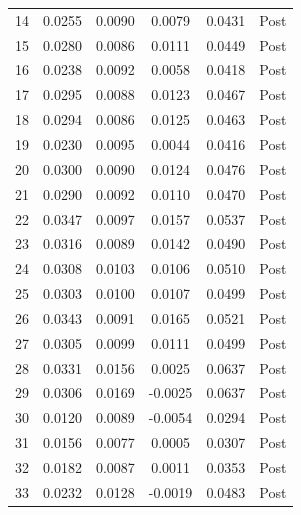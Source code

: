 \documentclass[bibtex]{article}
\begin{document}
{\begin{longtable}{cccccc}
14 & 0.0255 & 0.0090 & 0.0079 & 0.0431 & Post \\
15 & 0.0280 & 0.0086 & 0.0111 & 0.0449 & Post \\
16 & 0.0238 & 0.0092 & 0.0058 & 0.0418 & Post \\
17 & 0.0295 & 0.0088 & 0.0123 & 0.0467 & Post \\
18 & 0.0294 & 0.0086 & 0.0125 & 0.0463 & Post \\
19 & 0.0230 & 0.0095 & 0.0044 & 0.0416 & Post \\
20 & 0.0300 & 0.0090 & 0.0124 & 0.0476 & Post \\
21 & 0.0290 & 0.0092 & 0.0110 & 0.0470 & Post \\
22 & 0.0347 & 0.0097 & 0.0157 & 0.0537 & Post \\
23 & 0.0316 & 0.0089 & 0.0142 & 0.0490 & Post \\
24 & 0.0308 & 0.0103 & 0.0106 & 0.0510 & Post \\
25 & 0.0303 & 0.0100 & 0.0107 & 0.0499 & Post \\
26 & 0.0343 & 0.0091 & 0.0165 & 0.0521 & Post \\
27 & 0.0305 & 0.0099 & 0.0111 & 0.0499 & Post \\
28 & 0.0331 & 0.0156 & 0.0025 & 0.0637 & Post \\
29 & 0.0306 & 0.0169 & -0.0025 & 0.0637 & Post \\
30 & 0.0120 & 0.0089 & -0.0054 & 0.0294 & Post \\
31 & 0.0156 & 0.0077 & 0.0005 & 0.0307 & Post \\
32 & 0.0182 & 0.0087 & 0.0011 & 0.0353 & Post \\
33 & 0.0232 & 0.0128 & -0.0019 & 0.0483 & Post \\
\end{longtable}

}
\end{document}
